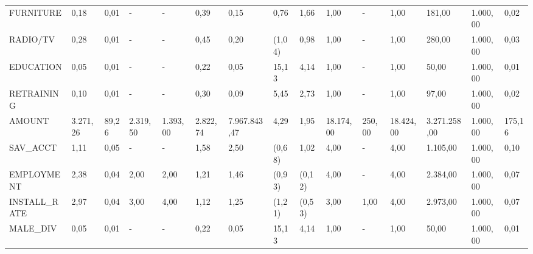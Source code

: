 \begin{table}[]
\begin{tabular}{|l|l|l|l|l|l|l|l|l|l|l|l|l|l|l|}
		{\tiny FURNITURE}& 0,18      & 0,01           & -        & -        & 0,39                                                           & 0,15               & 0,76     & 1,66     & 1,00        & -       & 1,00      & 181,00       & 1.000,00 & 0,02             \\
		{\tiny RADIO/TV}& 0,28      & 0,01           & -        & -        & 0,45                                                           & 0,20               & (1,04)   & 0,98     & 1,00        & -       & 1,00      & 280,00       & 1.000,00 & 0,03             \\
		{\tiny EDUCATION}& 0,05      & 0,01           & -        & -        & 0,22                                                           & 0,05               & 15,13    & 4,14     & 1,00        & -       & 1,00      & 50,00        & 1.000,00 & 0,01             \\
		{\tiny RETRAINING}& 0,10      & 0,01           & -        & -        & 0,30                                                           & 0,09               & 5,45     & 2,73     & 1,00        & -       & 1,00      & 97,00        & 1.000,00 & 0,02             \\
		{\tiny AMOUNT}& 3.271,26  & 89,26          & 2.319,50 & 1.393,00 & 2.822,74                                                       & 7.967.843,47       & 4,29     & 1,95     & 18.174,00   & 250,00  & 18.424,00 & 3.271.258,00 & 1.000,00 & 175,16           \\
		{\tiny SAV\_ACCT}& 1,11      & 0,05           & -        & -        & 1,58                                                           & 2,50               & (0,68)   & 1,02     & 4,00        & -       & 4,00      & 1.105,00     & 1.000,00 & 0,10             \\
		{\tiny EMPLOYMENT}& 2,38      & 0,04           & 2,00     & 2,00     & 1,21                                                           & 1,46               & (0,93)   & (0,12)   & 4,00        & -       & 4,00      & 2.384,00     & 1.000,00 & 0,07             \\
		{\tiny INSTALL\_RATE}& 2,97      & 0,04           & 3,00     & 4,00     & 1,12                                                           & 1,25               & (1,21)   & (0,53)   & 3,00        & 1,00    & 4,00      & 2.973,00     & 1.000,00 & 0,07             \\
		{\tiny MALE\_DIV}& 0,05      & 0,01           & -        & -        & 0,22                                                           & 0,05               & 15,13    & 4,14     & 1,00        & -       & 1,00      & 50,00        & 1.000,00 & 0,01             \\

\end{tabular}
\end{table}

